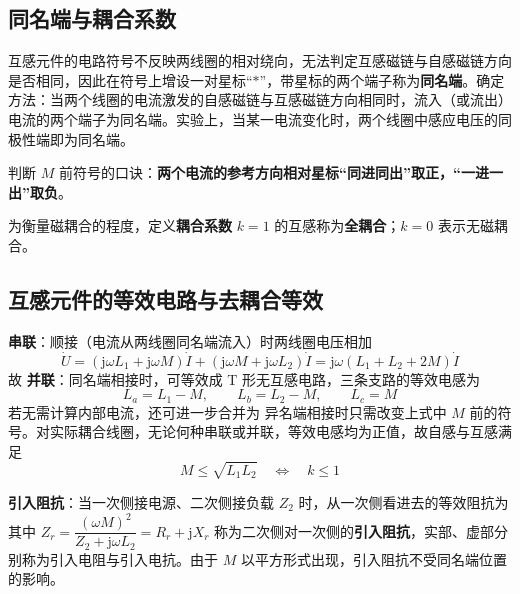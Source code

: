 \subsection{同名端与耦合系数}
互感元件的电路符号不反映两线圈的相对绕向，无法判定互感磁链与自感磁链方向是否相同，因此在符号上增设一对星标“$*$”，带星标的两个端子称为\textbf{同名端}。确定方法：当两个线圈的电流激发的自感磁链与互感磁链方向相同时，流入（或流出）电流的两个端子为同名端。实验上，当某一电流变化时，两个线圈中感应电压的同极性端即为同名端。

判断 $M$ 前符号的口诀：\textbf{两个电流的参考方向相对星标“同进同出”取正，“一进一出”取负}。

为衡量磁耦合的程度，定义\textbf{耦合系数}
$k=1$ 的互感称为\textbf{全耦合}；$k=0$ 表示无磁耦合。

\subsection{互感元件的等效电路与去耦合等效}
\textbf{串联}：顺接（电流从两线圈同名端流入）时两线圈电压相加
\begin{equation}
\dot{U}=\left(\mathrm{j}\omega L_1+\mathrm{j}\omega M\right)\dot{I}+\left(\mathrm{j}\omega M+\mathrm{j}\omega L_2\right)\dot{I}
=\mathrm{j}\omega\left(L_1+L_2+2M\right)\dot{I}
\end{equation}
故
\textbf{并联}：同名端相接时，可等效成 T 形无互感电路，三条支路的等效电感为
\begin{equation}
L_a=L_1-M,\qquad L_b=L_2-M,\qquad L_c=M
\end{equation}
若无需计算内部电流，还可进一步合并为
异名端相接时只需改变上式中 $M$ 前的符号。对实际耦合线圈，无论何种串联或并联，等效电感均为正值，故自感与互感满足
\begin{equation}
M\le\sqrt{L_1L_2}\quad\Longleftrightarrow\quad k\le1
\end{equation}

\textbf{引入阻抗}：当一次侧接电源、二次侧接负载 $Z_2$ 时，从一次侧看进去的等效阻抗为
其中 $Z_r=\dfrac{(\omega M)^2}{Z_2+\mathrm{j}\omega L_2}=R_r+\mathrm{j}X_r$ 称为二次侧对一次侧的\textbf{引入阻抗}，实部、虚部分别称为引入电阻与引入电抗。由于 $M$ 以平方形式出现，引入阻抗不受同名端位置的影响。


